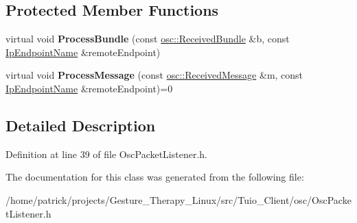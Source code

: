 \subsection*{Protected Member Functions}
\begin{DoxyCompactItemize}
\item 
\mbox{\label{classosc_1_1_osc_packet_listener_ac075dda3a826be1b3e98d4509444adc8}} 
virtual void {\bfseries Process\+Bundle} (const \hyperlink{classosc_1_1_received_bundle}{osc\+::\+Received\+Bundle} \&b, const \hyperlink{class_ip_endpoint_name}{Ip\+Endpoint\+Name} \&remote\+Endpoint)
\item 
\mbox{\label{classosc_1_1_osc_packet_listener_ab42a2bc453b71c7ce80a6b0a36570e2a}} 
virtual void {\bfseries Process\+Message} (const \hyperlink{classosc_1_1_received_message}{osc\+::\+Received\+Message} \&m, const \hyperlink{class_ip_endpoint_name}{Ip\+Endpoint\+Name} \&remote\+Endpoint)=0
\end{DoxyCompactItemize}


\subsection{Detailed Description}


Definition at line 39 of file Osc\+Packet\+Listener.\+h.



The documentation for this class was generated from the following file\+:\begin{DoxyCompactItemize}
\item 
/home/patrick/projects/\+Gesture\+\_\+\+Therapy\+\_\+\+Linux/src/\+Tuio\+\_\+\+Client/osc/Osc\+Packet\+Listener.\+h\end{DoxyCompactItemize}
